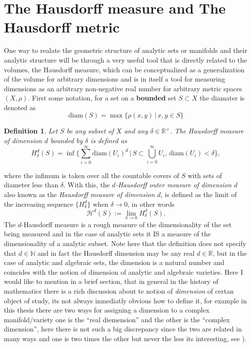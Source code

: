 \documentclass[12pt,twoside,a4paper]{report}
\newtheorem{definition}{Definition}[section]
\newcommand{\nat}{\ensuremath{ \mathbb N }}
\newcommand{\re}{\ensuremath{\mathbb R }}
\begin{document}
\section{The Hausdorff measure and The Hausdorff metric}
\noindent One way to realate the geometric structure of analytic sets or manifolds and their analytic structure will be through a very useful tool that is directly related to the volumes, the Hausdorff measure, which can be conceptualized as a generalization of the volume for arbitrary dimensions and is in itself a tool for measuring dimensions as an arbitrary non-negative real number for arbitrary metric spaces $(X,\rho)$. First some notation, for a set on a \textbf{bounded} set $S\subset X$ the diamater is denoted as
\[
\textrm{diam}(S)=\max\{\rho(x,y)\,|\,x,y\in S\}
\]
\begin{definition}
Let $S$ be any subset of $X$ and any $\delta\in\re^{+}$. The Hausdorff measure of dimension $d$ bounded by $\delta$ is defined as
\[
H_{\delta}^{d}(S)=\inf\Big\{\sum_{i=0}^{\infty}\mathrm{diam}(U_i)^{d}\,|\,S\subset\bigcup_{i=0}^{\infty}U_i,\,\mathrm{diam}(U_i)<\delta\Big\},
\]
\end{definition}
\noindent where the infimum is taken over all the countable covers of $S$ with sets of diameter less than $\delta$. With this, the \emph{$d$-Hausdorff outer measure of dimension $d$} also known as the \emph{Hausdorff measure of dimension $d$}, is defined as the limit of the increasing sequence $\{H_{\delta}^d\}$ when $\delta\rightarrow 0$, in other words
\[
\mathcal{H}^d(S):=\lim_{\delta\rightarrow 0}H_{\delta}^d(S).
\]
The $d$-Hausdorff measure is a rough measure of the dimensionality of the set being measured and in the case of analytic sets it IS a measure of the dimensionality of a analytic subset. Note here that the definition does not specify that $d\in\nat$ and in fact the Hausdorff dimension may be any real $d\in\re$, but in the case of analytic and algebraic sets, the dimension is a natural number and coincides with the notion of dimension of analytic and algebraic varieties. Here I would like to mention in a brief section, that in general in the history of mathematics there is a rich discussion about te notion of \emph{dimension} of certan object of study, its not always inmediatly obvious how to define it, for example in this thesis there are two ways for assigning a dimension to a complex manifold/variety one is the ``real diemension'' and the other is the ``complex dimension'', here there is not such a big discrepancy since the two are related in many ways and one is two times the other but never the less its interesting, see \cite{YURI-MANIM:ON-THE-NOTION-OF-DIMENSION..}).
\end{document}
